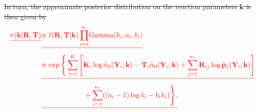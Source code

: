 \documentclass[final]{siamltex}
\providecommand{\DIFdel}[1]{{\protect\color{red}\sout{#1}}}                      %
\begin{document}
\DIFdel{In turn, the approximate posterior distribution on the reaction
parameters $\mathbf{k}$ is then given by
}\begin{align*}
	\DIFdel{\pi(\mathbf{k}|\mathbf{R}, \mathbf{T}) }&\DIFdel{\propto \ell(\mathbf{R}, \mathbf{T}|\mathbf{k})
	\prod_{i=1}^{n_r} \! \text{Gamma}(k_i; a_i, b_i) \notag }\\
		&\DIFdel{\propto \exp\Bigg\{\sum\limits_{i=1}^K \Bigg[
				\mathbf{K}_i\log
                  \bar{\alpha}_0(\mathbf{Y}_i; \mathbf{k}) -
                  \mathbf{T}_i \bar{\alpha}_0(\mathbf{Y}_i; \mathbf{k}) %
				+\sum_{j=1}^{n_r} \mathbf{R}_{ij}\log \bar{\mathbf{p}}_j(\mathbf{Y}_i; \mathbf{k})
			\Bigg]  \notag}\\
		&	\DIFdel{\qquad\qquad\qquad{} + \sum_{i=1}^{n_r} ((a_i-1)\log k_i - b_ik_i)\Bigg\}, %

}\end{align*}
\end{document}
